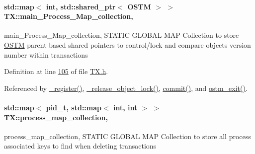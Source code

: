 \paragraph[{\texorpdfstring{main\+\_\+\+Process\+\_\+\+Map\+\_\+collection}{main_Process_Map_collection}}]{\setlength{\rightskip}{0pt plus 5cm}std\+::map$<$ int, std\+::shared\+\_\+ptr$<$ {\bf O\+S\+TM} $>$ $>$ T\+X\+::main\+\_\+\+Process\+\_\+\+Map\+\_\+collection\hspace{0.3cm}{\ttfamily [static]}, {\ttfamily [private]}}\hypertarget{class_t_x_a1a45d726894190695314464d7cd97c29_a1a45d726894190695314464d7cd97c29}{}\label{class_t_x_a1a45d726894190695314464d7cd97c29_a1a45d726894190695314464d7cd97c29}
main\+\_\+\+Process\+\_\+\+Map\+\_\+collection, S\+T\+A\+T\+IC G\+L\+O\+B\+AL M\+AP Collection to store \hyperlink{class_o_s_t_m}{O\+S\+TM} parent based shared pointers to control/lock and compare objects version number within transactions 

Definition at line \hyperlink{_t_x_8h_source_l00105}{105} of file \hyperlink{_t_x_8h_source}{T\+X.\+h}.



Referenced by \hyperlink{_t_x_8cpp_source_l00096}{\+\_\+register()}, \hyperlink{_t_x_8cpp_source_l00253}{\+\_\+release\+\_\+object\+\_\+lock()}, \hyperlink{_t_x_8cpp_source_l00177}{commit()}, and \hyperlink{_t_x_8cpp_source_l00068}{ostm\+\_\+exit()}.

\paragraph[{\texorpdfstring{process\+\_\+map\+\_\+collection}{process_map_collection}}]{\setlength{\rightskip}{0pt plus 5cm}std\+::map$<$ pid\+\_\+t, std\+::map$<$ int, int $>$ $>$ T\+X\+::process\+\_\+map\+\_\+collection\hspace{0.3cm}{\ttfamily [static]}, {\ttfamily [private]}}\hypertarget{class_t_x_a2e3cd2f52fd93cf6ef3eb3c1cb830b9f_a2e3cd2f52fd93cf6ef3eb3c1cb830b9f}{}\label{class_t_x_a2e3cd2f52fd93cf6ef3eb3c1cb830b9f_a2e3cd2f52fd93cf6ef3eb3c1cb830b9f}
process\+\_\+map\+\_\+collection, S\+T\+A\+T\+IC G\+L\+O\+B\+AL M\+AP Collection to store all process associated keys to find when deleting transactions 

